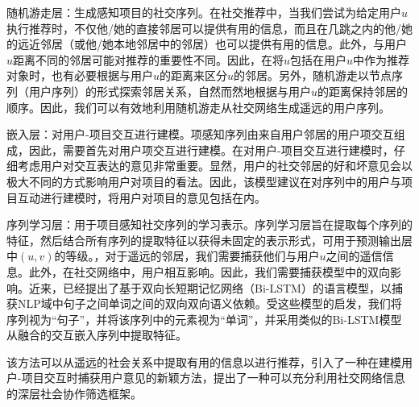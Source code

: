 随机游走层：生成感知项目的社交序列。在社交推荐中，当我们尝试为给定用户$u$执行推荐时，不仅他/她的直接邻居可以提供有用的信息，而且在几跳之内的他/她的远近邻居（或他/她本地邻居中的邻居）也可以提供有用的信息。此外，与用户$u$距离不同的邻居可能对推荐的重要性不同。因此，在将$u$包括在用户$u$中作为推荐对象时，也有必要根据与用户$u$的距离来区分$u$的邻居。另外，随机游走以节点序列（用户序列）的形式探索邻居关系，自然而然地根据与用户$u$的距离保持邻居的顺序。因此，我们可以有效地利用随机游走从社交网络生成遥远的用户序列。

嵌入层：对用户-项目交互进行建模。项感知序列由来自用户邻居的用户项交互组成，因此，需要首先对用户项交互进行建模。在对用户-项目交互进行建模时，仔细考虑用户对交互表达的意见非常重要。显然，用户的社交邻居的好和坏意见会以极大不同的方式影响用户对项目的看法。因此，该模型建议在对序列中的用户与项目互动进行建模时，将用户对项目的意见包括在内。

序列学习层：用于项目感知社交序列的学习表示。序列学习层旨在提取每个序列的特征，然后结合所有序列的提取特征以获得未固定的表示形式，可用于预测输出层中$(u,v)$的等级。，对于遥远的邻居，我们需要捕获他们与用户$u$之间的遥信信息。此外，在社交网络中，用户相互影响。因此，我们需要捕获模型中的双向影响。近来，已经提出了基于双向长短期记忆网络（Bi-LSTM）的语言模型，以捕获NLP域中句子之间单词之间的双向双向语义依赖。受这些模型的启发，我们将序列视为“句子”，并将该序列中的元素视为“单词”，并采用类似的Bi-LSTM模型从融合的交互嵌入序列中提取特征。

该方法可以从遥远的社会关系中提取有用的信息以进行推荐，引入了一种在建模用户-项目交互时捕获用户意见的新颖方法，提出了一种可以充分利用社交网络信息的深层社会协作筛选框架。

